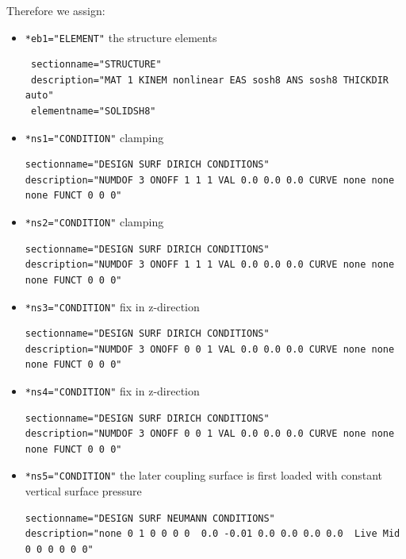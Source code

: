 Therefore we assign:
\begin{itemize}
 \item \verb|*eb1="ELEMENT"| \qquad the structure elements
 \begin{small} \begin{verbatim}
 sectionname="STRUCTURE"
 description="MAT 1 KINEM nonlinear EAS sosh8 ANS sosh8 THICKDIR auto"
 elementname="SOLIDSH8"
 \end{verbatim} \end{small}
 
 \item \verb|*ns1="CONDITION"| \qquad clamping
 \begin{small} \begin{verbatim}
sectionname="DESIGN SURF DIRICH CONDITIONS"
description="NUMDOF 3 ONOFF 1 1 1 VAL 0.0 0.0 0.0 CURVE none none none FUNCT 0 0 0"
 \end{verbatim} \end{small}
 
 \item \verb|*ns2="CONDITION"| \qquad clamping
 \begin{small} \begin{verbatim}
sectionname="DESIGN SURF DIRICH CONDITIONS"
description="NUMDOF 3 ONOFF 1 1 1 VAL 0.0 0.0 0.0 CURVE none none none FUNCT 0 0 0"
 \end{verbatim} \end{small}
 
 \item \verb|*ns3="CONDITION"| \qquad fix in z-direction
 \begin{small} \begin{verbatim}
sectionname="DESIGN SURF DIRICH CONDITIONS"
description="NUMDOF 3 ONOFF 0 0 1 VAL 0.0 0.0 0.0 CURVE none none none FUNCT 0 0 0"
 \end{verbatim} \end{small}
 
 \item \verb|*ns4="CONDITION"| \qquad fix in z-direction
 \begin{small} \begin{verbatim}
sectionname="DESIGN SURF DIRICH CONDITIONS"
description="NUMDOF 3 ONOFF 0 0 1 VAL 0.0 0.0 0.0 CURVE none none none FUNCT 0 0 0"
 \end{verbatim} \end{small}
 
 \item \verb|*ns5="CONDITION"| \qquad the later coupling surface is first loaded with constant vertical surface pressure
 \begin{small} \begin{verbatim}
sectionname="DESIGN SURF NEUMANN CONDITIONS"
description="none 0 1 0 0 0 0  0.0 -0.01 0.0 0.0 0.0 0.0  Live Mid 0 0 0 0 0 0"
 \end{verbatim} \end{small}
 

\end{itemize}
